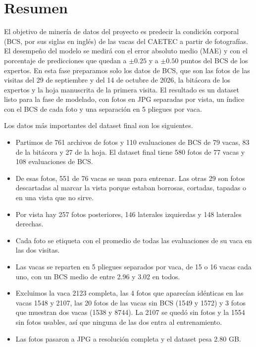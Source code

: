 \section*{Resumen}

El objetivo de minería de datos del proyecto es predecir la condición corporal (BCS, por sus siglas en inglés) de las vacas del CAETEC a partir de fotografías. El desempeño del modelo se medirá con el error absoluto medio (MAE) y con el porcentaje de predicciones que quedan a $\pm0.25$ y a $\pm0.50$ puntos del BCS de los expertos. En esta fase preparamos solo los datos de BCS, que son las fotos de las visitas del 29 de septiembre y del 14 de octubre de 2026, la bitácora de los expertos y la hoja manuscrita de la primera visita. El resultado es un dataset listo para la fase de modelado, con fotos en JPG separadas por vista, un índice con el BCS de cada foto y una separación en 5 pliegues por vaca.

Los datos más importantes del dataset final son los siguientes.

\begin{itemize}
  \item Partimos de 761 archivos de fotos y 110 evaluaciones de BCS de 79 vacas, 83 de la bitácora y 27 de la hoja. El dataset final tiene 580 fotos de 77 vacas y 108 evaluaciones de BCS.
  \item De esas fotos, 551 de 76 vacas se usan para entrenar. Las otras 29 son fotos descartadas al marcar la vista porque estaban borrosas, cortadas, tapadas o en una vista que no sirve.
  \item Por vista hay 257 fotos posteriores, 146 laterales izquierdas y 148 laterales derechas.
  \item Cada foto se etiqueta con el promedio de todas las evaluaciones de su vaca en las dos visitas.
  \item Las vacas se reparten en 5 pliegues separados por vaca, de 15 o 16 vacas cada uno, con un BCS medio de entre 2.96 y 3.02 en todos.
  \item Excluimos la vaca 2123 completa, las 4 fotos que aparecían idénticas en las vacas 1548 y 2107, las 20 fotos de las vacas sin BCS (1549 y 1572) y 3 fotos que muestran dos vacas (1538 y 8744). La 2107 se quedó sin fotos y la 1554 sin fotos usables, así que ninguna de las dos entra al entrenamiento.
  \item Las fotos pasaron a JPG a resolución completa y el dataset pesa 2.80 GB.
\end{itemize}
